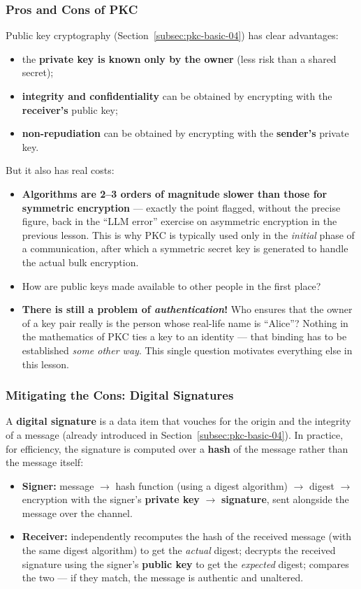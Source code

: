 \documentclass[12pt, a4paper]{article}
\begin{document}
\subsubsection{Pros and Cons of PKC}
Public key cryptography (Section~\ref{subsec:pkc-basic-04}) has clear advantages:
\begin{itemize}
    \item the \textbf{private key is known only by the owner} (less risk than a shared secret);
    \item \textbf{integrity and confidentiality} can be obtained by encrypting with the \textbf{receiver's} public key;
    \item \textbf{non-repudiation} can be obtained by encrypting with the \textbf{sender's} private key.
\end{itemize}
But it also has real costs:
\begin{itemize}
    \item \textcolor{red!70!black}{\textbf{Algorithms are 2--3 orders of magnitude slower than those for symmetric encryption}} --- exactly the point flagged, without the precise figure, back in the ``LLM error'' exercise on asymmetric encryption in the previous lesson. This is why PKC is typically used only in the \emph{initial} phase of a communication, after which a symmetric secret key is generated to handle the actual bulk encryption.
    \item How are public keys made available to other people in the first place?
    \item \textcolor{red!70!black}{\textbf{There is still a problem of \emph{authentication}!}} Who ensures that the owner of a key pair really is the person whose real-life name is ``Alice''? Nothing in the mathematics of PKC ties a key to an identity --- that binding has to be established \emph{some other way}. This single question motivates everything else in this lesson.
\end{itemize}

\subsubsection{Mitigating the Cons: Digital Signatures}
\label{subsec:digital-signatures-05}
A \textbf{digital signature} is a data item that vouches for the origin and the integrity of a message (already introduced in Section~\ref{subsec:pkc-basic-04}). In practice, for efficiency, the signature is computed over a \textbf{hash} of the message rather than the message itself:
\begin{itemize}
    \item \textbf{Signer:} message $\to$ hash function (using a digest algorithm) $\to$ digest $\to$ encryption with the signer's \textbf{private key} $\to$ \textbf{signature}, sent alongside the message over the channel.
    \item \textbf{Receiver:} independently recomputes the hash of the received message (with the same digest algorithm) to get the \emph{actual} digest; decrypts the received signature using the signer's \textbf{public key} to get the \emph{expected} digest; compares the two --- if they match, the message is authentic and unaltered.
\end{itemize}
\end{document}
